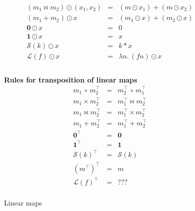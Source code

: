 \documentclass[sigplan]{acmart}
\renewcommand{\dot}{.\,}               %
\newcommand{\lmapply}{\odot}   %
\newcommand{\lmcomp}{\,\circ\,}   %
\newcommand{\lmtrans}[1]{#1^{\top}}   %
\newcommand{\lmpair}{\times}         %
\newcommand{\lmjoin}{\bowtie}        %
\newcommand{\lmzero}{\mathbf{0}}     %
\newcommand{\lmone}{\mathbf{1}}      %
\newcommand{\lmscalar}[1]{{\mathcal S}(#1)}      %
\newcommand{\lmlam}[1]{{\mathcal L}(#1)}      %
\begin{document}
\begin{figure}
{\begin{minipage}{\textwidth}
$$\begin{array}{rcl}
    (m_1 \lmjoin m_2)  \lmapply (x_1,x_2) & = & (m \lmapply x_1) + (m \lmapply x_2) \\
    (m_1 + m_2)  \lmapply x & = & (m_1 \lmapply x) + (m_2 \lmapply x) \\
    \lmzero \lmapply x  & = & 0 \\
    \lmone \lmapply x & = & x \\
    \lmscalar{k} \lmapply x & = & k * x \\
    \lmlam{f} \lmapply x & = & \lambda n\dot (f n) \lmapply x \\
   \end{array}    
  $$    
  \vspace{2mm} \\

  {\bf Rules for transposition of linear maps}
  $$
  \begin{array}{rcl}
    \lmtrans{m_1 \lmcomp m_2} & = & \lmtrans{m_2} \lmcomp \lmtrans{m_1} \\
    \lmtrans{m_1 \lmpair m_2} & = & \lmtrans{m_1} \lmjoin \lmtrans{m_2} \\
    \lmtrans{m_1 \lmjoin m_2} & = & \lmtrans{m_1} \lmpair \lmtrans{m_2} \\
    \lmtrans{m_1 + m_2} & = & \lmtrans{m_1} + \lmtrans{m_2} \\
    \lmtrans{\lmzero} & = & \lmzero \\
    \lmtrans{\lmone} & = & \lmone \\
    \lmtrans{\lmscalar{k}} & = & \lmscalar{k} \\
    \lmtrans{(\lmtrans{m})} & = & m \\
    \lmtrans{\lmlam{f}} & = & ??? \\
  \end{array}
  $$
% 
\end{minipage}}
  \caption{Linear maps} \label{fig:linear-maps}
\end{figure}
\end{document}
